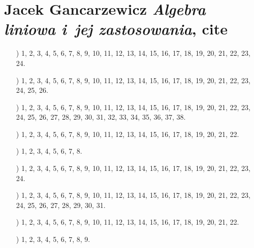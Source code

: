 \documentclass[a4paper,11pt]{article}
\numberwithin{equation}{section}
\begin{document}
\section{Jacek Gancarzewicz \textit{Algebra liniowa i~jej
    zastosowania}, cite{}}

\label{sec:Oznaczenia-i-konwencje}


\begin{itemize}

\item[\romannumeral1)] 1, 2, 3, 4, 5, 6, 7, 8, 9, 10, 11, 12, 13, 14, 15,
  16, 17, 18, 19, 20, 21, 22, 23, 24.

\item[\romannumeral2)] 1, 2, 3, 4, 5, 6, 7, 8, 9, 10, 11, 12, 13, 14, 15,
  16, 17, 18, 19, 20, 21, 22, 23, 24, 25, 26.

\item[\romannumeral3)] 1, 2, 3, 4, 5, 6, 7, 8, 9, 10, 11, 12, 13, 14, 15,
  16, 17, 18, 19, 20, 21, 22, 23, 24, 25, 26, 27, 28, 29, 30, 31, 32, 33,
  34, 35, 36, 37, 38.

\item[\romannumeral4)] 1, 2, 3, 4, 5, 6, 7, 8, 9, 10, 11, 12, 13, 14, 15,
  16, 17, 18, 19, 20, 21, 22.

\item[\romannumeral5)] 1, 2, 3, 4, 5, 6, 7, 8.

\item[\romannumeral6)] 1, 2, 3, 4, 5, 6, 7, 8, 9, 10, 11, 12, 13, 14, 15,
  16, 17, 18, 19, 20, 21, 22, 23, 24.

\item[\romannumeral7)] 1, 2, 3, 4, 5, 6, 7, 8, 9, 10, 11, 12, 13, 14, 15,
  16, 17, 18, 19, 20, 21, 22, 23, 24, 25, 26, 27, 28, 29, 30, 31.

\item[\romannumeral8)] 1, 2, 3, 4, 5, 6, 7, 8, 9, 10, 11, 12, 13, 14, 15,
  16, 17, 18, 19, 20, 21, 22.

\item[\romannumeral9)] 1, 2, 3, 4, 5, 6, 7, 8, 9.

\end{itemize}
\end{document}

